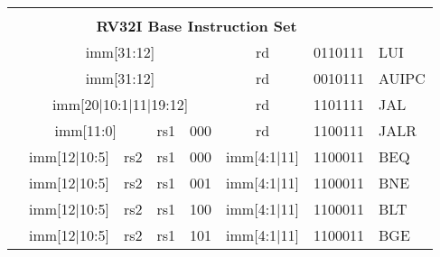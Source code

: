 \begin{table}[p]
\begin{small}
\begin{center}
\begin{tabular}{p{0in}p{0.4in}p{0.05in}p{0.05in}p{0.05in}p{0.05in}p{0.4in}p{0.6in}p{0.4in}p{0.6in}p{0.7in}l}
        &
        \multicolumn{10}{c}{} & \\
        &
        \multicolumn{10}{c}{\bf RV32I Base Instruction Set} & \\
        \cline{2-11}


        &
        \multicolumn{8}{|c|}{imm[31:12]} &
        \multicolumn{1}{c|}{rd} &
        \multicolumn{1}{c|}{0110111} & LUI \\
        \cline{2-11}


        &
        \multicolumn{8}{|c|}{imm[31:12]} &
        \multicolumn{1}{c|}{rd} &
        \multicolumn{1}{c|}{0010111} & AUIPC \\
        \cline{2-11}


        &
        \multicolumn{8}{|c|}{imm[20$\vert$10:1$\vert$11$\vert$19:12]} &
        \multicolumn{1}{c|}{rd} &
        \multicolumn{1}{c|}{1101111} & JAL \\
        \cline{2-11}


        &
        \multicolumn{6}{|c|}{imm[11:0]} &
        \multicolumn{1}{c|}{rs1} &
        \multicolumn{1}{c|}{000} &
        \multicolumn{1}{c|}{rd} &
        \multicolumn{1}{c|}{1100111} & JALR \\
        \cline{2-11}


        &
        \multicolumn{4}{|c|}{imm[12$\vert$10:5]} &
        \multicolumn{2}{c|}{rs2} &
        \multicolumn{1}{c|}{rs1} &
        \multicolumn{1}{c|}{000} &
        \multicolumn{1}{c|}{imm[4:1$\vert$11]} &
        \multicolumn{1}{c|}{1100011} & BEQ \\
        \cline{2-11}


        &
        \multicolumn{4}{|c|}{imm[12$\vert$10:5]} &
        \multicolumn{2}{c|}{rs2} &
        \multicolumn{1}{c|}{rs1} &
        \multicolumn{1}{c|}{001} &
        \multicolumn{1}{c|}{imm[4:1$\vert$11]} &
        \multicolumn{1}{c|}{1100011} & BNE \\
        \cline{2-11}


        &
        \multicolumn{4}{|c|}{imm[12$\vert$10:5]} &
        \multicolumn{2}{c|}{rs2} &
        \multicolumn{1}{c|}{rs1} &
        \multicolumn{1}{c|}{100} &
        \multicolumn{1}{c|}{imm[4:1$\vert$11]} &
        \multicolumn{1}{c|}{1100011} & BLT \\
        \cline{2-11}


        &
        \multicolumn{4}{|c|}{imm[12$\vert$10:5]} &
        \multicolumn{2}{c|}{rs2} &
        \multicolumn{1}{c|}{rs1} &
        \multicolumn{1}{c|}{101} &
        \multicolumn{1}{c|}{imm[4:1$\vert$11]} &
        \multicolumn{1}{c|}{1100011} & BGE \\
        \cline{2-11}



\end{tabular}
\end{center}
\end{small}
\end{table}
